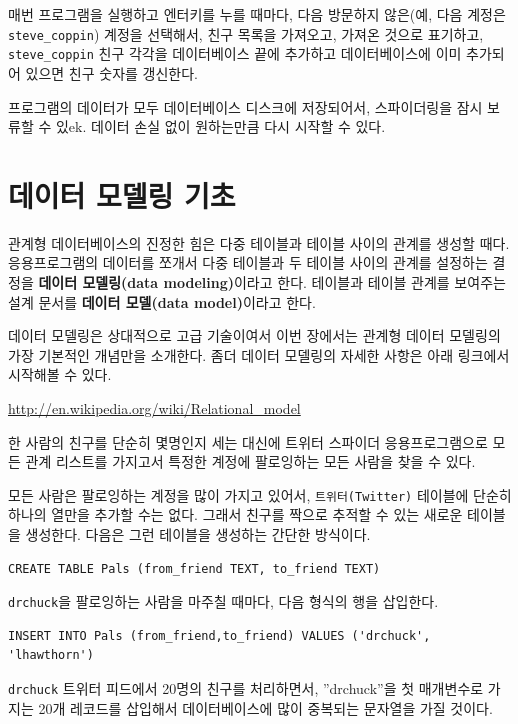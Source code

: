 매번 프로그램을 실행하고 엔터키를 누를 때마다, 
다음 방문하지 않은(예, 다음 계정은 \verb"steve_coppin") 계정을 선택해서, 
친구 목록을 가져오고, 가져온 것으로 표기하고, \verb"steve_coppin" 친구 각각을 데이터베이스 끝에
추가하고 데이터베이스에 이미 추가되어 있으면 친구 숫자를 갱신한다.

프로그램의 데이터가 모두 데이터베이스 디스크에 저장되어서, 스파이더링을 잠시 보류할 수 있ek.
데이터 손실 없이 원하는만큼 다시 시작할 수 있다.

\section{데이터 모델링 기초}

관계형 데이터베이스의 진정한 힘은 다중 테이블과 테이블 사이의 관계를 생성할 때다.
응용프로그램의 데이터를 쪼개서 다중 테이블과 두 테이블 사이의 관계를 설정하는 결정을 
{\bf 데이터 모델링(data modeling)}이라고 한다. 테이블과 테이블 관계를 보여주는 설계 문서를 
{\bf 데이터 모델(data model)}이라고 한다.

데이터 모델링은 상대적으로 고급 기술이여서 이번 장에서는 관계형 데이터 모델링의 가장 기본적인 개념만을 소개한다.
좀더 데이터 모델링의 자세한 사항은 아래 링크에서 시작해볼 수 있다.

\url{http://en.wikipedia.org/wiki/Relational_model}

한 사람의 친구를 단순히 몇명인지 세는 대신에 트위터 스파이더 응용프로그램으로 모든 관계 리스트를 가지고서 특정한 계정에
팔로잉하는 모든 사람을 찾을 수 있다.

모든 사람은 팔로잉하는 계정을 많이 가지고 있어서, {\tt 트위터(Twitter)} 테이블에 단순히 하나의 열만을 추가할 수는 없다.
그래서 친구를 짝으로 추적할 수 있는 새로운 테이블을 생성한다. 다음은 그런 테이블을 생성하는 간단한 방식이다.

\beforeverb
\begin{verbatim}
CREATE TABLE Pals (from_friend TEXT, to_friend TEXT)
\end{verbatim}
\afterverb
%

{\tt drchuck}을 팔로잉하는 사람을 마주칠 때마다, 다음 형식의 행을 삽입한다.

\beforeverb
\begin{verbatim}
INSERT INTO Pals (from_friend,to_friend) VALUES ('drchuck', 'lhawthorn')
\end{verbatim}
\afterverb
%

{\tt drchuck} 트위터 피드에서 20명의 친구를 처리하면서, ''drchuck''을 첫 매개변수로 가지는 20개 레코드를 삽입해서
데이터베이스에 많이 중복되는 문자열을 가질 것이다.

